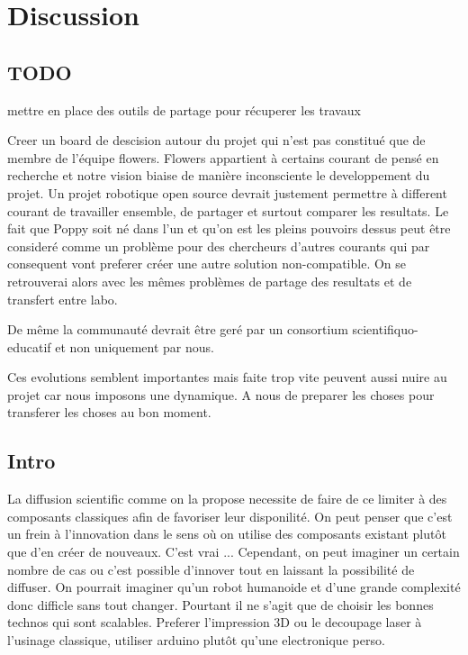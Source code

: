 
\chapter{Discussion} %


\section{TODO} %

mettre en place des outils de partage pour récuperer les travaux


Creer un board de descision autour du projet qui n'est pas constitué que de membre de l'équipe flowers.
Flowers appartient à certains courant de pensé en recherche et notre vision biaise de manière inconsciente le developpement du projet. Un projet robotique open source devrait justement permettre à different courant de travailler ensemble, de partager et surtout comparer les resultats. Le fait que Poppy soit né dans l'un et qu'on est les pleins pouvoirs dessus peut être consideré comme un problème pour des chercheurs d'autres courants qui par consequent vont preferer créer une autre solution non-compatible. On se retrouverai alors avec les mêmes problèmes de partage des resultats et de transfert entre labo.

De même la communauté devrait être geré par un consortium scientifiquo-educatif et non uniquement par nous.

Ces evolutions semblent importantes mais faite trop vite peuvent aussi nuire au projet car nous imposons une dynamique. A nous de preparer les choses pour transferer les choses au bon moment.


\section{Intro} %
La diffusion scientific comme on la propose necessite de faire de ce limiter à des composants classiques afin de favoriser leur disponilité. On peut penser que c'est un frein à l'innovation dans le sens où on utilise des composants existant plutôt que d'en créer de nouveaux. C'est vrai ...
Cependant, on peut imaginer un certain nombre de cas ou c'est possible d'innover tout en laissant la possibilité de diffuser. On pourrait imaginer qu'un robot humanoide et d'une grande complexité donc difficle sans tout changer. Pourtant il ne s'agit que de choisir les bonnes technos qui sont scalables. Preferer l'impression 3D ou le decoupage laser à l'usinage classique, utiliser arduino plutôt qu'une electronique perso.

